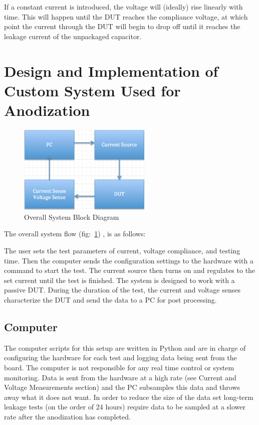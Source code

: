 \documentclass[journal]{IEEEtran}
\begin{document}
If a constant current is introduced, the voltage will (ideally) rise linearly with time. This will happen until the DUT reaches the compliance voltage, at which point the current through the DUT will begin to drop off until it reaches the leakage current of the unpackaged capacitor. 

\section{Design and Implementation of Custom System Used for Anodization}

\begin{figure}[here]
\centering
\includegraphics[width=2.5in]{blockDiagram}
\caption{Overall System Block Diagram}
\label{fig:blockDiagram}
\end{figure}

The overall system flow (fig:~\ref{fig:blockDiagram}) , is as follows:

The user sets the test parameters of current, voltage compliance, and testing time. Then the computer sends the configuration settings to the hardware with a command to start the test. The current source then turns on and regulates to the set current until the test is finished. The system is designed to work with a passive DUT. During the duration of the test, the current and voltage senses characterize the DUT and send the data to a PC for post processing.

\subsection{Computer}

The computer scripts for this setup are written in Python and are in charge of configuring the hardware for each test and logging data being sent from the board. The computer is not responsible for any real time control or system monitoring. Data is sent from the hardware at a high rate (see Current and Voltage Measurements section) and the PC subsamples this data and throws away what it does not want. In order to reduce the size of the data set long-term leakage tests (on the order of 24 hours) require data to be sampled at a slower rate after the anodization has completed.
\end{document}
